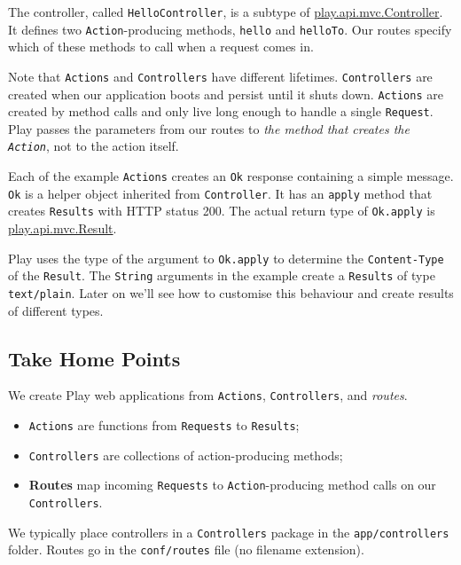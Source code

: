 \documentclass[oneside,11pt,a4paper,]{book}
\begin{document}
The controller, called \texttt{HelloController}, is a subtype of
\href{https://www.playframework.com/documentation/2.3.x/api/scala/index.html\#play.api.mvc.Controller}{play.api.mvc.Controller}.
It defines two \texttt{Action}-producing methods, \texttt{hello} and
\texttt{helloTo}. Our routes specify which of these methods to call when
a request comes in.

Note that \texttt{Actions} and \texttt{Controllers} have different
lifetimes. \texttt{Controllers} are created when our application boots
and persist until it shuts down. \texttt{Actions} are created by method
calls and only live long enough to handle a single \texttt{Request}.
Play passes the parameters from our routes to \emph{the method that
creates the \texttt{Action}}, not to the action itself.

Each of the example \texttt{Actions} creates an \texttt{Ok} response
containing a simple message. \texttt{Ok} is a helper object inherited
from \texttt{Controller}. It has an \texttt{apply} method that creates
\texttt{Results} with HTTP status 200. The actual return type of
\texttt{Ok.apply} is
\href{https://www.playframework.com/documentation/2.3.x/api/scala/index.html\#play.api.mvc.Result}{play.api.mvc.Result}.

Play uses the type of the argument to \texttt{Ok.apply} to determine the
\texttt{Content-Type} of the \texttt{Result}. The \texttt{String}
arguments in the example create a \texttt{Results} of type
\texttt{text/plain}. Later on we'll see how to customise this behaviour
and create results of different types.

\subsection{Take Home Points}\label{take-home-points}

We create Play web applications from \texttt{Actions},
\texttt{Controllers}, and \emph{routes}.

\begin{itemize}
\item
  \texttt{Actions} are functions from \texttt{Requests} to
  \texttt{Results};
\item
  \texttt{Controllers} are collections of action-producing methods;
\item
  \textbf{Routes} map incoming \texttt{Requests} to
  \texttt{Action}-producing method calls on our \texttt{Controllers}.
\end{itemize}

We typically place controllers in a \texttt{Controllers} package in the
\texttt{app/controllers} folder. Routes go in the \texttt{conf/routes}
file (no filename extension).
\end{document}
